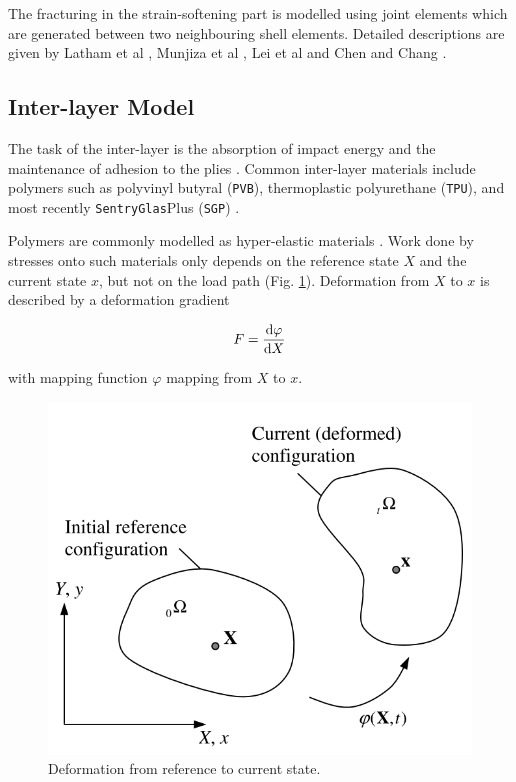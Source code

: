 \documentclass[12pt,twoside]{article}
\theoremstyle{break}
\begin{document}
The fracturing in the strain-softening part is modelled using joint elements which are generated between two neighbouring shell elements. Detailed descriptions are given by Latham et al \cite{Lat15}, Munjiza et al \cite{Mun04}, Lei et al \cite{Lei16} and Chen and Chang \cite{Che18}.

\subsection{Inter-layer Model}

The task of the inter-layer is the absorption of impact energy and the maintenance of adhesion to the plies \cite{Wu14}. Common inter-layer materials include polymers such as polyvinyl butyral (\texttt{PVB}), thermoplastic polyurethane (\texttt{TPU}), and most recently \texttt{SentryGlas}\textregistered Plus (\texttt{SGP}) \cite{Moh18, Wan18}. 

\bigbreak
Polymers are commonly modelled as hyper-elastic materials \cite{Gha15, Kim15}. Work done by stresses onto such materials only depends on the reference state $X$ and the current state $x$, but not on the load path (Fig. \ref{fig:deformation}). Deformation from $X$ to $x$ is described by a deformation gradient \cite{Gu07}

\begin{equation}
    \label{eq:defgrad}
    F = \frac{{\rm{d}}\varphi}{{\rm{d}}X}
\end{equation}

with mapping function $\varphi$ mapping from $X$ to $x$.

\begin{figure}[!htbp]
    \centering
    \includegraphics[width=\textwidth*2/3]{Deformation}
    \caption{Deformation from reference to current state. \cite{Gu07}}
    \label{fig:deformation}
\end{figure}
\end{document}
